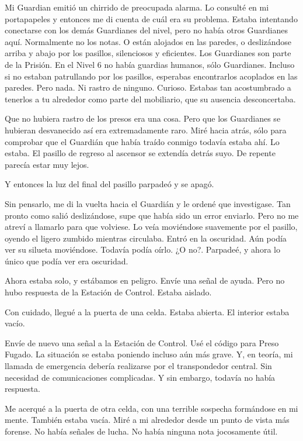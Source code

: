 Mi Guardian emitió un chirrido de preocupada alarma. Lo consulté en mi
portapapeles y entonces me di cuenta de cuál era su problema. Estaba
intentando conectarse con los demás Guardianes del nivel, pero no había
otros Guardianes aquí. Normalmente no los notas. O están alojados en las
paredes, o deslizándose arriba y abajo por los pasillos, silenciosos y
eficientes. Los Guardianes son parte de la Prisión. En el Nivel 6 no
había guardias humanos, sólo Guardianes. Incluso si no estaban
patrullando por los pasillos, esperabas encontrarlos acoplados en las
paredes. Pero nada. Ni rastro de ninguno. Curioso. Estabas tan
acostumbrado a tenerlos a tu alrededor como parte del mobiliario, que su
ausencia desconcertaba.

Que no hubiera rastro de los presos era una cosa. Pero que los
Guardianes se hubieran desvanecido así era extremadamente raro. Miré
hacia atrás, sólo para comprobar que el Guardián que había traído
conmigo todavía estaba ahí. Lo estaba. El pasillo de regreso al ascensor
se extendía detrás suyo. De repente parecía estar muy lejos.

Y entonces la luz del final del pasillo parpadeó y se apagó.

Sin pensarlo, me di la vuelta hacia el Guardián y le ordené que
investigase. Tan pronto como salió deslizándose, supe que había sido un
error enviarlo. Pero no me atreví a llamarlo para que volviese. Lo veía
moviéndose suavemente por el pasillo, oyendo el ligero zumbido mientras
circulaba. Entró en la oscuridad. Aún podía ver su silueta moviéndose.
Todavía podía oírlo. ¿O no?. Parpadeé, y ahora lo único que podía ver
era oscuridad.

Ahora estaba solo, y estábamos en peligro. Envíe una señal de ayuda.
Pero no hubo respuesta de la Estación de Control. Estaba aislado.

Con cuidado, llegué a la puerta de una celda. Estaba abierta. El
interior estaba vacío.

Envíe de nuevo una señal a la Estación de Control. Usé el código para
Preso Fugado. La situación se estaba poniendo incluso aún más grave. Y,
en teoría, mi llamada de emergencia debería realizarse por el
transpondedor central. Sin necesidad de comunicaciones complicadas. Y
sin embargo, todavía no había respuesta.

Me acerqué a la puerta de otra celda, con una terrible sospecha
formándose en mi mente. También estaba vacía. Miré a mi alrededor desde
un punto de vista más forense. No había señales de lucha. No había
ninguna nota jocosamente útil.

